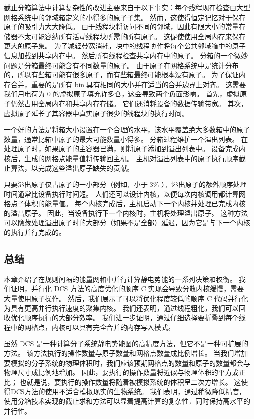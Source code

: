 截止分箱算法中计算复杂性的改进主要来自于以下事实：每个线程现在检查由大型网格系统中的邻域箱定义的小得多的原子子集。 
然而，这使得恒定记忆对于保存原子的吸引力大大降低。 
由于线程块将访问不同的邻域，因此有限大小的常量存储器不太可能容纳所有活动线程块所需的所有原子。 
这促使使用全局内存来保存更大的原子集。 为了减轻带宽消耗，块中的线程协作将每个公共邻域箱中的原子信息加载到共享内存中。 
然后所有线程检查共享内存中的原子。 分箱的一个微妙问题是分箱最终可能含有不同数量的原子。 
由于原子在网格系统中是统计分布的，所以有些箱可能有很多原子，而有些箱最终可能根本没有原子。 
为了保证内存合并，重要的是所有 bin 具有相同的大小并在适当的合并边界上对齐。 
这需要我们用电荷为 0 的虚拟原子填充许多仓，这会导致两个负面影响。 
首先，虚拟原子仍然占用全局内存和共享内存存储。 它们还消耗设备的数据传输带宽。 
其次，虚拟原子延长了其容器中真实原子很少的线程块的执行时间。

一个好的方法是将箱大小设置在一个合理的水平，该水平覆盖绝大多数箱中的原子数量，通常比箱中原子的最大可能数量小得多。 
分箱过程维护一个溢出列表。 在处理原子时，如果原子的主容器已满，则将原子添加到溢出列表中。 
设备完成内核后，生成的网格点能量值将传输回主机。 主机对溢出列表中的原子执行顺序截止算法，以完成这些溢出原子缺失的贡献。

只要溢出原子仅占原子的一小部分（例如，小于 $3 \%$ ），溢出原子的额外顺序处理时间通常比设备执行时间短。 
人们还可以设计内核，以便每次内核调用都计算网格点子体积的能量值。 
每个内核完成后，主机启动下一个内核并处理已完成内核的溢出原子。 
因此，当设备执行下一个内核时，主机将处理溢出原子。 
这种方法可以隐藏处理溢出原子时的大部分（如果不是全部）延迟，因为它是与下一个内核的执行并行完成的。

\subsection{总结}
本章介绍了在规则间隔的能量网格中并行计算静电势能的一系列决策和权衡。 
我们证明，并行化 DCS 方法的高度优化的顺序 C 实现会导致分散内核缓慢，需要大量使用原子操作。 
然后，我们展示了可以将优化程度较低的顺序 C 代码并行化为具有更高并行执行速度的聚集内核。 
我们还表明，通过线程粗化，我们可以回收优化顺序执行的大部分效率。 
我们进一步证明，通过仔细选择要折叠到每个线程中的网格点，内核可以具有完全合并的内存写入模式。

虽然 DCS 是一种计算分子系统静电势能图的高精度方法，但它不是一种可扩展的方法。 
该方法执行的操作数量与原子数量和网格点数量成比例增长。 
当我们增加要模拟的分子系统的物理体积时，我们应该预期网格点的数量和原子的数量都会与物理尺寸成比例地增加。 
因此，要执行的操作数量将近似与物理体积的平方成正比； 也就是说，要执行的操作数量将随着被模拟系统的体积呈二次方增长。 
这使得DCS方法的使用不适合模拟现实的生物系统。 
我们表明，通过稍微降低精度，使用分箱技术实现的截止求和方法可以显着提高计算的复杂性，同时保持高水平的并行性。